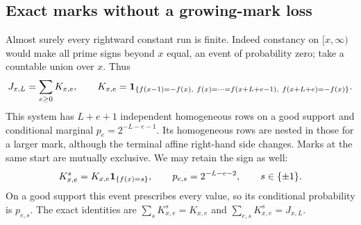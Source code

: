 \subsection{Exact marks without a growing-mark loss}
Almost surely every rightward constant run is finite. Indeed constancy on
$[x,\infty)$ would make all prime signs beyond $x$ equal, an event of
probability zero; take a countable union over $x$. Thus
\begin{equation}\label{eq:mark-partition}
 J_{x,L}=\sum_{e\ge0}K_{x,e},\qquad
 K_{x,e}=\mathbf 1_{\{f(x-1)=-f(x),\ f(x)=\cdots=f(x+L+e-1),\
                              f(x+L+e)=-f(x)\}}.
\end{equation}
This system has $L+e+1$ independent homogeneous rows on a good support and
conditional marginal $p_e=2^{-L-e-1}$. Its homogeneous rows are nested in
those for a larger mark, although the terminal affine right-hand side
changes. Marks at the same start are mutually exclusive. We may retain the sign as
well:
\begin{equation}\label{eq:signed-mark}
 K^s_{x,e}=K_{x,e}\mathbf 1_{\{f(x)=s\}},\qquad
 p_{e,s}=2^{-L-e-2},\qquad s\in\{\pm1\}.
\end{equation}
On a good support this event prescribes every value, so its conditional
probability is $p_{e,s}$. The exact identities are
$\sum_sK^s_{x,e}=K_{x,e}$ and $\sum_{e,s}K^s_{x,e}=J_{x,L}$.

